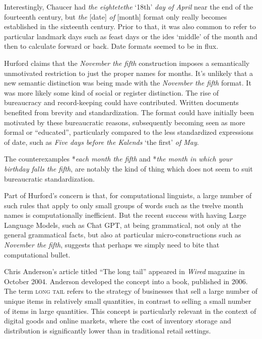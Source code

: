 Interestingly, Chaucer had \textit{the eightetethe} `18th' \textit{day of April} near the end of the fourteenth century, but \textit{the} [date] \textit{of} [month] format only really becomes established in the sixteenth century. Prior to that, it was also common to refer to particular landmark days such as feast days or the ides `middle' of the month and then to calculate forward or back. Date formats seemed to be in flux.

Hurford claims that the \textit{November the fifth} construction imposes a semantically unmotivated restriction to just the proper names for months. It's unlikely that a new semantic distinction was being made with the \textit{November the fifth} format. It was more likely some kind of social or register distinction. The rise of bureaucracy and record-keeping could have contributed. Written documents benefited from brevity and standardization. The format could have initially been motivated by these bureaucratic reasons, subsequently becoming seen as more formal or ``educated'', particularly compared to the less standardized expressions of date, such as \textit{Five days before the Kalends} `the first' \textit{of May}.

The counterexamples *\textit{each month the fifth} and *\textit{the month in which your birthday falls the fifth}, are notably the kind of thing which does not seem to suit bureaucratic standardization.

Part of Hurford's concern is that, for computational linguists, a large number of such rules that apply to only small groups of words such as the twelve month names is computationally inefficient. But the recent success with having Large Language Models, such as Chat GPT, at being grammatical, not only at the general grammatical facts, but also at particular micro-constructions such as \textit{November the fifth}, suggests that perhaps we simply need to bite that computational bullet.

\bigskip

Chris Anderson's article titled ``The long tail'' appeared in \textit{Wired} magazine in October 2004. Anderson developed the concept into a book, published in 2006. The term \textsc{long tail} refers to the strategy of businesses that sell a large number of unique items in relatively small quantities, in contrast to selling a small number of items in large quantities. This concept is particularly relevant in the context of digital goods and online markets, where the cost of inventory storage and distribution is significantly lower than in traditional retail settings.

